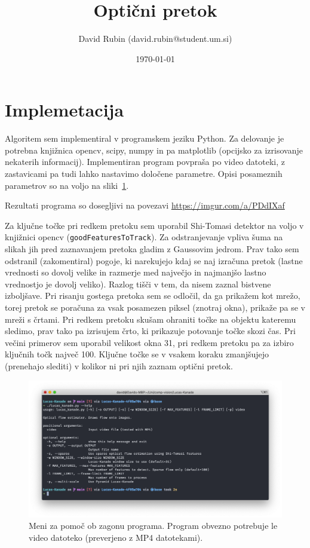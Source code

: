 \documentclass[a4paper,11pt]{article}
\title{Optični pretok}
\author{David Rubin (david.rubin@student.um.si)}
\date{\today}
\begin{document}
\maketitle

\section{Implemetacija}

Algoritem sem implementiral v programskem jeziku Python. Za delovanje je potrebna knjižnica opencv, scipy, numpy in pa matplotlib (opcijsko za izrisovanje nekaterih informacij). Implementiran program povpraša po video datoteki, z zastavicami pa tudi lahko nastavimo določene parametre. Opisi posameznih parametrov so na voljo na sliki~\ref{img:prog_help}.

Rezultati programa so dosegljivi na povezavi \url{https://imgur.com/a/PDdIXaf}

\vspace{0.5cm}
Za ključne točke pri redkem pretoku sem uporabil Shi-Tomasi detektor na voljo v knjižnici opencv (\texttt{goodFeaturesToTrack}). Za odstranjevanje vpliva šuma na slikah jih pred zaznavanjem pretoka gladim z Gaussovim jedrom. Prav tako sem odstranil (zakomentiral) pogoje, ki narekujejo kdaj se naj izračuna pretok (lastne vrednosti so dovolj velike in razmerje med največjo in najmanjšo lastno vrednostjo je dovolj veliko). Razlog tišči v tem, da nisem zaznal bistvene izboljšave. Pri risanju gostega pretoka sem se odločil, da ga prikažem kot mrežo, torej pretok se poračuna za vsak posamezen piksel (znotraj okna), prikaže pa se v mreži s črtami. Pri redkem pretoku skušam ohraniti točke na objektu kateremu sledimo, prav tako pa izrisujem črto, ki prikazuje potovanje točke skozi čas. Pri večini primerov sem uporabil velikost okna 31, pri redkem pretoku pa za izbiro ključnih točk največ 100. Ključne točke se v vsakem koraku zmanjšujejo (prenehajo slediti) v kolikor ni pri njih zaznam optični pretok.

\begin{figure}
	\centering
	\includegraphics[width=1\textwidth]{images/prog_help}
	\caption{Meni za pomoč ob zagonu programa. Program obvezno potrebuje le video datoteko (preverjeno z MP4 datotekami).}
	\label{img:prog_help}
\end{figure}
\end{document}

